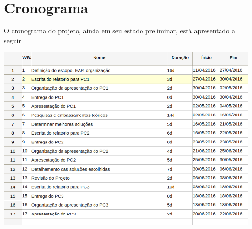 \section{Cronograma}

O cronograma do projeto, ainda em seu estado preliminar,
está apresentado a seguir
\begin{table}[ht]
  \centering
  \includegraphics[scale=0.6]{figuras/cronograma}
\end{table}
